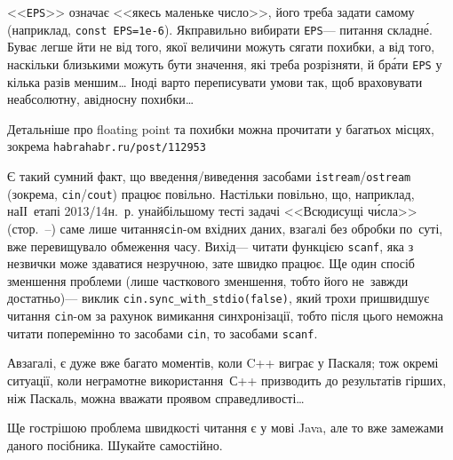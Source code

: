 <<\texttt{EPS}>> означає <<якесь маленьке число>>, його треба задати самому (наприклад, \texttt{const \mbox{EPS=1e-6}}). Як\nolinebreak[3] правильно вибирати \texttt{EPS}\nolinebreak[3] --- питання складн\'{е}. Буває легше йти не від того, якої величини можуть сягати похибки, а від того, наскільки близькими можуть бути значення, які треба розрізняти, й бр\'{а}ти \texttt{EPS} у кілька разів меншим\dots{} Іноді варто переписувати умови так, щоб враховувати не\nolinebreak[3] абсолютну, а\nolinebreak[3] відносну похибки\dots

Детальніше про floating point та похибки можна прочитати у багатьох місцях, зокрема \verb"habrahabr.ru/post/112953"\label{text:floating-point-end}

\label{text:io-streams-versus-scanf-printf}
Є такий сумний факт, що введення/\nolinebreak[2]виведення засобами \texttt{istream}/\nolinebreak[2]\texttt{ostream} (зокрема, \texttt{cin}/\nolinebreak[2]\texttt{cout}) працює повільно. Настільки повільно, що, наприклад, на\nolinebreak[2] ІІ~етапі 2013/14\nolinebreak[3] н.~р. у\nolinebreak[2] найбільшому тесті задачі <<Всюдисущі ч\'{и}сла>> (стор.~\mbox{\pageref{sec:omnipresent-numbers}--\pageref{text:omnipresent-numbers-end}}) саме лише читання\nolinebreak[1] \mbox{\verb"cin"-ом} вхідних даних, взагалі без обробки по~суті, вже перевищувало обмеження часу. Вихід\nolinebreak[3] --- читати функцією \texttt{scanf}, яка з незвички може здаватися незруч\-ною, зате швидко працює. Ще один спосіб зменшення проблеми (лише часткового зменшення, тобто його не~завжди достатньо)\nolinebreak[3] --- виклик \verb"cin.sync_with_stdio(false)", який трохи пришвидшує читання \verb"cin"-ом за рахунок вимикання синхронізації, тобто після цього не\nolinebreak[3] можна читати поперемінно то засобами \verb"cin", то засобами \verb"scanf".

А\nolinebreak[3] взагалі, є дуже вже багато моментів, коли C++ виграє у Паскаля; тож окремі ситуації, коли неграмотне використання~С++ призводить до результатів гірших, ніж Паскаль, можна вважати проявом справедливості\dots

Ще гострішою проблема швидкості читання є у мові Java, але то вже за\nolinebreak[3] межами даного посібника. Шукайте самостійно.\label{text:FAQ-end}


